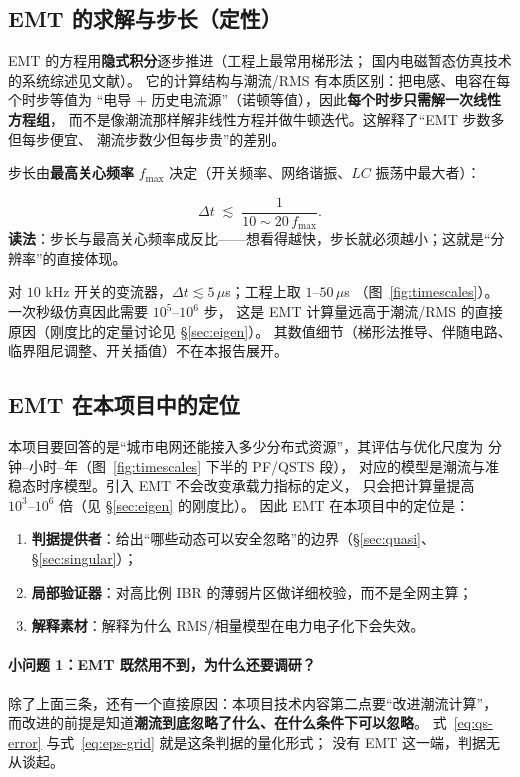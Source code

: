 \subsection{EMT 的求解与步长（定性）}

EMT 的方程用\textbf{隐式积分}逐步推进（工程上最常用梯形法\cite{dommel1969,watson2007}；
国内电磁暂态仿真技术的系统综述见文献\cite{dong2018}）。
它的计算结构与潮流/RMS 有本质区别：把电感、电容在每个时步等值为
“电导 $+$ 历史电流源”（诺顿等值），因此\textbf{每个时步只需解一次线性方程组}，
而不是像潮流那样解非线性方程并做牛顿迭代。这解释了“EMT 步数多但每步便宜、
潮流步数少但每步贵”的差别。

步长由\textbf{最高关心频率} $f_{\max}$ 决定（开关频率、网络谐振、$LC$ 振荡中最大者）：

\begin{equation}
\Delta t \;\lesssim\; \frac{1}{10\sim20\,f_{\max}} .
\label{eq:emt-dt}
\end{equation}
\textbf{读法}：步长与最高关心频率成反比——想看得越快，步长就必须越小；这就是“分辨率”的直接体现。

对 $10$ kHz 开关的变流器，$\Delta t\lesssim5\,\mu$s；工程上取 $1$--$50\,\mu$s
（图~\ref{fig:timescales}）。一次秒级仿真因此需要 $10^{5}$--$10^{6}$ 步，
这是 EMT 计算量远高于潮流/RMS 的直接原因（刚度比的定量讨论见 \S\ref{sec:eigen}）。
其数值细节（梯形法推导、伴随电路、临界阻尼调整、开关插值）不在本报告展开。

\subsection{EMT 在本项目中的定位}

本项目要回答的是“城市电网还能接入多少分布式资源”，其评估与优化尺度为
分钟--小时--年（图~\ref{fig:timescales} 下半的 PF/QSTS 段），
对应的模型是潮流与准稳态时序模型。引入 EMT 不会改变承载力指标的定义，
只会把计算量提高 $10^{3}\text{--}10^{6}$ 倍（见 \S\ref{sec:eigen} 的刚度比）。
因此 EMT 在本项目中的定位是：
\begin{enumerate}[leftmargin=1.6em]
\item \textbf{判据提供者}：给出“哪些动态可以安全忽略”的边界（\S\ref{sec:quasi}、\S\ref{sec:singular}）；
\item \textbf{局部验证器}：对高比例 IBR 的薄弱片区做详细校验，而不是全网主算；
\item \textbf{解释素材}：解释为什么 RMS/相量模型在电力电子化下会失效。
\end{enumerate}

\paragraph{小问题 1：EMT 既然用不到，为什么还要调研？}
除了上面三条，还有一个直接原因：本项目技术内容第二点要“改进潮流计算”，
而改进的前提是知道\textbf{潮流到底忽略了什么、在什么条件下可以忽略}。
式~\eqref{eq:qs-error} 与式~\eqref{eq:eps-grid} 就是这条判据的量化形式；
没有 EMT 这一端，判据无从谈起。

